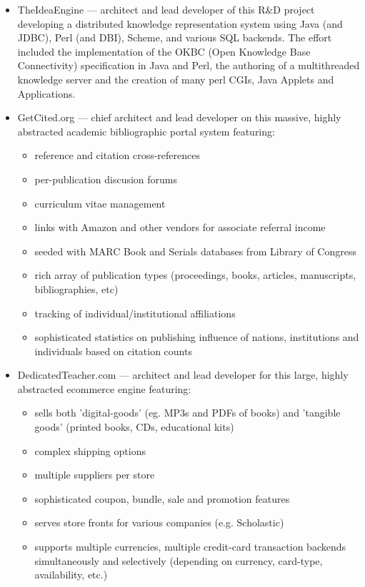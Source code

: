 \begin{resume}
\begin{position}
\begin{itemize}

\item TheIdeaEngine --- architect and lead developer of this R\&D project 
  developing a distributed knowledge representation system using 
  Java (and JDBC), Perl (and DBI), Scheme, and various SQL backends.  
  The effort included the
  implementation of the OKBC (Open Knowledge Base Connectivity)
  specification in Java and Perl,
  the authoring of a multithreaded knowledge server
  and the creation of many perl CGIs, Java Applets and Applications.

\item GetCited.org --- chief architect and lead developer on
  this massive, highly abstracted academic bibliographic portal system featuring:
  \begin{itemize}
    \item reference and citation cross-references
    \item per-publication discusion forums
    \item curriculum vitae management
    \item links with Amazon and other vendors for associate
    referral income
    \item seeded with MARC Book and Serials databases from Library of Congress
    \item rich array of publication types (proceedings, books, articles,
       manuscripts, bibliographies, etc)
    \item tracking of individual/institutional affiliations
    \item sophisticated statistics on publishing influence of
       nations, institutions and individuals based on citation counts
  \end{itemize}    

\item DedicatedTeacher.com --- architect and lead developer
  for this large, highly abstracted ecommerce engine featuring:
    \begin{itemize}
      \item sells both 'digital-goods' (eg. MP3s and PDFs of books)
      and 'tangible goods' (printed books, CDs, educational kits)
      \item complex shipping options
      \item multiple suppliers per store
      \item sophisticated coupon, bundle, sale and promotion features
      \item serves store fronts for various companies 
      (e.g. Scholastic)
      \item supports multiple currencies, multiple credit-card
      transaction backends simultaneously and selectively 
      (depending on currency, card-type, availability, etc.)
    \end{itemize}


\end{itemize}
\end{position}
\end{resume}
